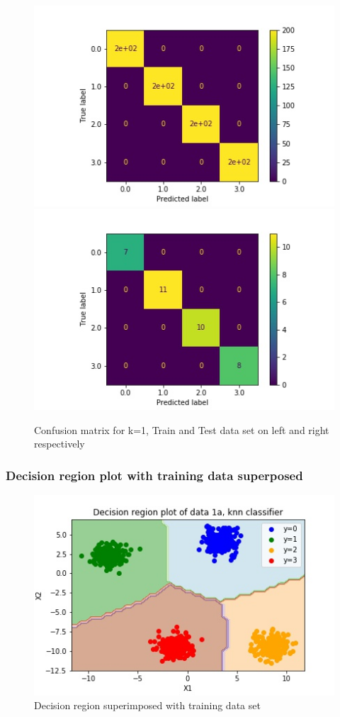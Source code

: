 \documentclass[11pt,a4paper]{article}
\begin{document}
\begin{figure}[H]
    \centering
    \includegraphics[scale=0.5]{images/1a_cm_knn_train.jpg}
    \includegraphics[scale=0.5]{images/1a_cm_knn_test.jpg}
    \caption{Confusion matrix for k=1, Train and Test data set on left and right respectively}
    \label{fig:1a_cm_knn}
\end{figure}

\subsubsection{Decision region plot with training data superposed}

\begin{figure}[H]
    \centering
    \includegraphics[scale=0.5]{images/1a_knn_decision_region.jpg}
    \caption{Decision region superimposed with training data set}
    \label{fig:1a_decreg_knn}
\end{figure}
\end{document}
